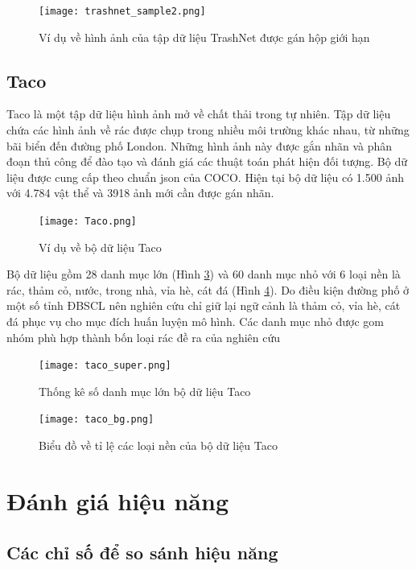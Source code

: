 \documentclass[../the.tex]{subfiles}
\begin{document}
\begin{figure}[H]
	\centering
		\texttt{[image: trashnet\_sample2.png]}
		\caption{Ví dụ về hình ảnh của tập dữ liệu TrashNet được gán hộp giới hạn}
		\label{fig:dataset_1}
	\end{figure}
	


\subsection{Taco}

{\fontsize{13}{12} \selectfont 
Taco là một tập dữ liệu hình ảnh mở về chất thải trong tự nhiên. Tập dữ liệu chứa các hình ảnh về rác được chụp trong nhiều môi trường khác nhau, từ những bãi biển đến đường phố London. Những hình ảnh này được gắn nhãn và phân đoạn thủ công để đào tạo và đánh giá các thuật toán phát hiện đối tượng.
Bộ dữ liệu được cung cấp 
theo chuẩn json của COCO. Hiện tại bộ dữ liệu có 1.500 ảnh với 4.784 vật thể 
và 3918 ảnh mới cần được gán nhãn.
}

\begin{figure}[H]
	\centering
		\texttt{[image: Taco.png]}
		\caption{Ví dụ về bộ dữ liệu Taco \cite{proença2020taco}}
		\label{fig:dataset_taco}
	\end{figure}
{\fontsize{13}{12} \selectfont 

Bộ dữ liệu gồm 28 danh mục lớn  (Hình \ref{fig:dataset_taco1}) và 60 danh mục nhỏ với 
6 loại nền là rác, thảm cỏ, nước, trong nhà, vỉa hè, cát đá (Hình \ref{fig:dataset_taco2}). Do 
điều kiện đường phố ở một số tỉnh ĐBSCL nên nghiên cứu chỉ giữ lại ngữ cảnh 
là thảm cỏ, vỉa hè, cát đá phục vụ cho mục đích huấn luyện mô hình. Các danh 
mục nhỏ được gom nhóm phù hợp thành bốn loại rác đề ra của nghiên cứu
}
\begin{figure}[H]
	\centering
		\texttt{[image: taco\_super.png]}
		\caption{Thống kê số danh mục lớn bộ dữ liệu Taco \cite{proença2020taco}}
		\label{fig:dataset_taco1}
	\end{figure}
	\begin{figure}[H]
		\centering
			\texttt{[image: taco\_bg.png]}
			\caption{Biểu đồ về tỉ lệ các loại nền của bộ dữ liệu Taco \cite{proença2020taco}}
			\label{fig:dataset_taco2}
		\end{figure}
\section{Đánh giá hiệu năng}
\label{sec:eval}


\subsection{Các chỉ số để so sánh hiệu năng}
\end{document}
